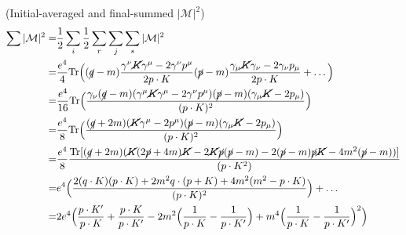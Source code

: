 \begin{cor}
(Initial-averaged and final-summed $|\mathcal{M}|^2$)
\[\begin{align*}
\sum |\mathcal{M}|^2=&\dfrac{1}{2}\sum _{i}\dfrac{1}{2}\sum _{r}\sum _{j}\sum _{s}|\mathcal{M}|^2\\
=&\dfrac{e^{4}}{4}\mathrm{Tr}\Big((\cancel{q}-m)\dfrac{\gamma ^{\nu }\cancel{K}\gamma ^{\mu }-2\gamma ^{\nu }p^{\mu }}{2p\cdot K}(\cancel{p}-m)\dfrac{\gamma _{\mu }\cancel{K}\gamma _{\nu }-2\gamma _{\nu }p_{\mu }}{2p\cdot K}+\ldots \Big)\\
=&\dfrac{e^{4}}{16}\mathrm{Tr}\Big(\dfrac{\gamma _{\nu }(\cancel{q}-m)(\gamma ^{\mu }\cancel{K}\gamma ^{\mu }-2\gamma ^{\nu }p^{\mu })(\cancel{p}-m)(\gamma _{\mu }\cancel{K}-2p_{\mu })}{(p\cdot K)^2}\Big)\\
=&\dfrac{e^{4}}{8}\mathrm{Tr}\Big(\dfrac{(\cancel{q}+2m)(\cancel{K}\gamma ^{\mu }-2p^{\mu })(\cancel{p}-m)(\gamma _{\mu }\cancel{K}-2p_{\mu })}{(p\cdot K)^2}\Big)\\
=&\dfrac{e^{4}}{8}\dfrac{\mathrm{Tr}[(\cancel{q}+2m)(\cancel{K}(2\cancel{p}+4m)\cancel{K}-2\cancel{K}\cancel{p}(\cancel{p}-m)-2(\cancel{p}-m)\cancel{p}\cancel{K}-4m^2(\cancel{p}-m))]}{(p\cdot K^2)}\\
=&e^{4}\Big(\dfrac{2(q\cdot K)(p\cdot K)+2m^2q\cdot (p+K)+4m^2(m^2-p\cdot K)}{(p\cdot K)^2}\Big)+\ldots \\
=&2e^{4}\Big(\dfrac{p\cdot K'}{p\cdot K}+\dfrac{p\cdot K}{p\cdot K'}-2m^2\Big(\dfrac{1}{p\cdot K}-\dfrac{1}{p\cdot K'}\Big)+m^{4}\Big(\dfrac{1}{p\cdot K}-\dfrac{1}{p\cdot K'}\Big)^2\Big)
\end{align*}\]
\end{cor}
\vspace{2ex}
